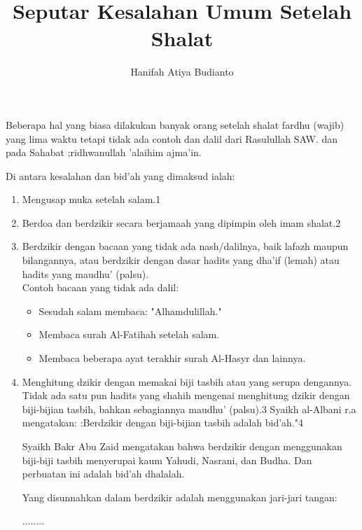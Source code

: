 \documentclass[a4paper,12pt]{article}
\title{\Large Seputar Kesalahan Umum Setelah Shalat}
\author{\calligra Hanifah Atiya Budianto}
\begin{document}
\sffamily
\maketitle 
\fullvocalize
{}
\par
\indent
Beberapa hal yang biasa dilakukan banyak orang setelah shalat fardhu (wajib) yang lima waktu tetapi tidak ada contoh dan dalil dari Rasulullah SAW. dan pada Sahabat ;ridhwanullah 'alaihim ajma'in.\\
\par
\indent
Di antara kesalahan dan bid'ah yang dimaksud ialah:
\begin{enumerate}
\item Mengusap muka setelah salam.1
\item Berdoa dan berdzikir secara berjamaah yang dipimpin oleh imam shalat.2
\item Berdzikir dengan bacaan yang tidak ada nash/dalilnya, baik lafazh maupun bilangannya, atau berdzikir dengan dasar hadits yang dha'if (lemah) atau hadits yang maudhu' (palsu).\\
Contoh bacaan yang tidak ada dalil:\\
\begin{itemize}
\item Sesudah salam membaca: "Alhamdulillah."
\item Membaca surah Al-Fatihah setelah salam.
\item Membaca beberapa ayat terakhir surah Al-Hasyr dan lainnya.
\end{itemize}
\item Menghitung dzikir dengan memakai biji tasbih atau yang serupa dengannya. Tidak ada satu pun hadits yang shahih mengenai menghitung dzikir dengan biji-bijian tasbih, bahkan sebagiannya maudhu' (palsu).3 Syaikh al-Albani r.a mengatakan: :Berdzikir dengan biji-bijian tasbih adalah bid'ah."4\\
\par
\indent
Syaikh Bakr Abu Zaid mengatakan bahwa berdzikir dengan menggunakan biji-biji tasbih menyerupai kaum Yahudi, Nasrani, dan Budha. Dan perbuatan ini adalah bid'ah dhalalah.\\
\par
\indent
Yang disunnahkan dalam berdzikir adalah menggunakan jari-jari tangan:\\
\begin{arabtext}
\noindent
........ \\ \\
\end{arabtext}

\end{enumerate}
\end{document}
